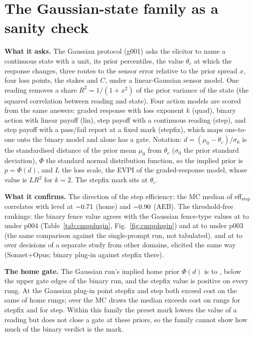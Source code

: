 \documentclass{article}
\begin{document}
\FloatBarrier
\section{The Gaussian-state family as a sanity check}
\label{app:gauss}

\textbf{What it asks.} The Gaussian protocol (g001) asks the elicitor to name a continuous state with a unit, its prior percentiles, the value $\theta_c$ at which the response changes, three routes to the sensor error relative to the prior spread $x$, four loss points, the stakes and $C$, under a linear-Gaussian sensor model. One reading removes a share $R^2=1/(1+x^2)$ of the prior variance of the state (the squared correlation between reading and state). Four action models are scored from the same answers: graded response with loss exponent $k$ (quad), binary action with linear payoff (lin), step payoff with a continuous reading (step), and step payoff with a pass/fail report at a fixed mark (stepfix), which maps one-to-one onto the binary model and alone has a gate. Notation: $d=(\mu_0-\theta_c)/\sigma_0$ is the standardised distance of the prior mean $\mu_0$ from $\theta_c$ ($\sigma_0$ the prior standard deviation), $\Phi$ the standard normal distribution function, so the implied prior is $p=\Phi(d)$, and $L$ the loss scale, the EVPI of the graded-response model, whose value is $LR^2$ for $k=2$. The stepfix mark sits at $\theta_c$.

\textbf{What it confirms.} The direction of the step efficiency: the MC median of eff$_\mathrm{step}$ correlates with level at $-0.71$ (home) and $-0.90$ (AEB). The threshold-free rankings: the binary fence value agrees with the Gaussian fence-type values at \voiFenceStepfixRho{} to \voiFenceQuadRho{} under p004 (Table~\ref{tab:cmpplugin}, Fig.~\ref{fig:cmpplugin}) and at \voicmpsingleFenceStepfixRho{} to \voicmpsingleFenceQuadRho{} under p003 (the same comparison against the single-prompt run, not tabulated), and at \voibizFenceStepRho{} to \voibizFenceStepfixRho{} over \voibizGaussN{} decisions of a separate study from other domains, elicited the same way (Sonnet+Opus; binary plug-in against stepfix \voibizGaussPluginRhoStepfix{} there).

\textbf{The home gate.} The Gaussian run's implied home prior $\Phi(d)$ is \twGaussHomePLo{} to \twGaussHomePHi, below the upper gate edges of the binary run, and the stepfix value is positive on every rung. At the Gaussian plug-in point stepfix and step both exceed cost on the same \twGaussHomeStepfixPlug{} of \twNHome{} home rungs; over the MC draws the median exceeds cost on \twGaussHomeStepfixMC{} rungs for stepfix and \twGaussHomeStepMC{} for step. Within this family the preset mark lowers the value of a reading but does not close a gate at these priors, so the family cannot show how much of the binary verdict is the mark.
\end{document}
